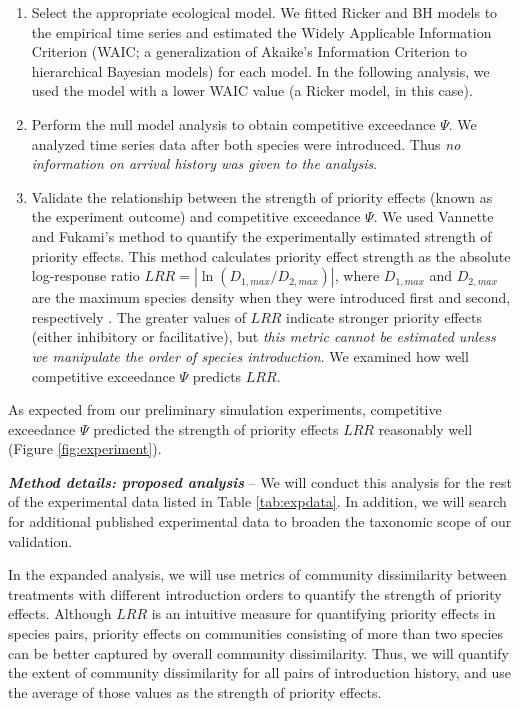 \documentclass[12pt, class=article, crop=false]{standalone}
\begin{document}
\begin{enumerate}
    \item Select the appropriate ecological model.
    We fitted Ricker and BH models to the empirical time series and estimated the Widely Applicable Information Criterion (WAIC; a generalization of Akaike's Information Criterion to hierarchical Bayesian models) \citep{watanabe_widely_2013} for each model.
    In the following analysis, we used the model with a lower WAIC value (a Ricker model, in this case).
    \item Perform the null model analysis to obtain competitive exceedance $\Psi$.
    We analyzed time series data after both species were introduced.
    Thus \textit{no information on arrival history was given to the analysis}.
    \item Validate the relationship between the strength of priority effects (known as the experiment outcome) and competitive exceedance $\Psi$.
    We used Vannette and Fukami's method \citep{vannette_historical_2014} to quantify the experimentally estimated strength of priority effects.
    This method calculates priority effect strength as the absolute log-response ratio $LRR = |\ln (D_{1, max} / D_{2, max})|$, where $D_{1, max}$ and $D_{2, max}$ are the maximum species density when they were introduced first and second, respectively \citep{hsu_metabolic_2021}.
    The greater values of $LRR$ indicate stronger priority effects (either inhibitory or facilitative), but \textit{this metric cannot be estimated unless we manipulate the order of species introduction}.
    We examined how well competitive exceedance $\Psi$ predicts $LRR$.
\end{enumerate}

As expected from our preliminary simulation experiments, competitive exceedance $\Psi$ predicted the strength of priority effects $LRR$ reasonably well (Figure \ref{fig:experiment}).

\textit{\textbf{Method details: proposed analysis}} --
We will conduct this analysis for the rest of the experimental data listed in Table \ref{tab:expdata}.
In addition, we will search for additional published experimental data to broaden the taxonomic scope of our validation.

In the expanded analysis, we will use metrics of community dissimilarity between treatments with different introduction orders to quantify the strength of priority effects.
Although $LRR$ is an intuitive measure for quantifying priority effects in species pairs, priority effects on communities consisting of more than two species can be better captured by overall community dissimilarity.
Thus, we will quantify the extent of community dissimilarity for all pairs of introduction history, and use the average of those values as the strength of priority effects.
\end{document}
